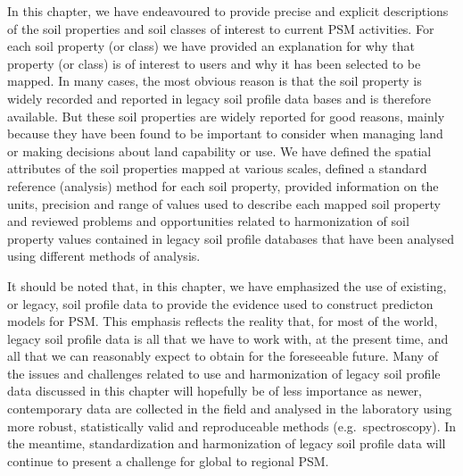 \documentclass[graybox,natbib,nospthms,UStrade]{svmono}
\begin{document}
In this chapter, we have endeavoured to provide precise and explicit
descriptions of the soil properties and soil classes of interest to current PSM activities.
For each soil property (or class) we have provided an explanation for
why that property (or class) is of interest to users and why it has been
selected to be mapped. In many cases, the most
obvious reason is that the soil property is widely recorded and reported
in legacy soil profile data bases and is therefore available. But these
soil properties are widely reported for good reasons, mainly because
they have been found to be important to consider when managing land or
making decisions about land capability or use. We have defined the
spatial attributes of the soil properties mapped at various scales,
defined a standard reference (analysis) method for each soil property,
provided information on the units, precision and range of values used to
describe each mapped soil property and reviewed problems and
opportunities related to harmonization of soil property values contained
in legacy soil profile databases that have been analysed using different
methods of analysis.

It should be noted that, in this chapter, we have emphasized the use of
existing, or legacy, soil profile data to provide the evidence used to
construct predicton models for PSM. This emphasis reflects the reality
that, for most of the world, legacy soil profile data is all that we
have to work with, at the present time, and all that we can reasonably
expect to obtain for the foreseeable future. Many of the issues and
challenges related to use and harmonization of legacy soil profile data
discussed in this chapter will hopefully be of less importance as newer,
contemporary data are collected in the field and analysed in the laboratory
using more robust, statistically valid and reproduceable methods (e.g.~spectroscopy).
In the meantime, standardization and harmonization of legacy soil profile
data will continue to present a challenge for global to regional PSM.
\end{document}

